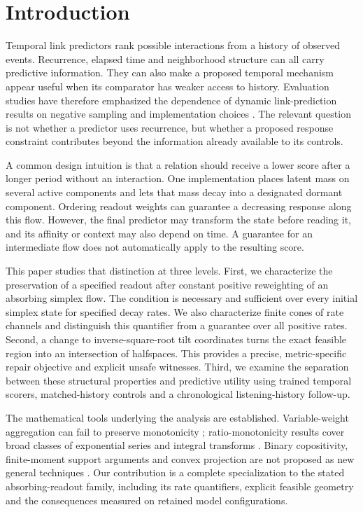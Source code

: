 \section{Introduction}\label{sec:introduction}
Temporal link predictors rank possible interactions from a history of observed events. Recurrence, elapsed time and neighborhood structure can all carry predictive information. They can also make a proposed temporal mechanism appear useful when its comparator has weaker access to history. Evaluation studies have therefore emphasized the dependence of dynamic link-prediction results on negative sampling and implementation choices \cite{evaluation,dyglib}. The relevant question is not whether a predictor uses recurrence, but whether a proposed response constraint contributes beyond the information already available to its controls.

A common design intuition is that a relation should receive a lower score after a longer period without an interaction. One implementation places latent mass on several active components and lets that mass decay into a designated dormant component. Ordering readout weights can guarantee a decreasing response along this flow. However, the final predictor may transform the state before reading it, and its affinity or context may also depend on time. A guarantee for an intermediate flow does not automatically apply to the resulting score.

This paper studies that distinction at three levels. First, we characterize the preservation of a specified readout after constant positive reweighting of an absorbing simplex flow. The condition is necessary and sufficient over every initial simplex state for specified decay rates. We also characterize finite cones of rate channels and distinguish this quantifier from a guarantee over all positive rates. Second, a change to inverse-square-root tilt coordinates turns the exact feasible region into an intersection of halfspaces. This provides a precise, metric-specific repair objective and explicit unsafe witnesses. Third, we examine the separation between these structural properties and predictive utility using trained temporal scorers, matched-history controls and a chronological listening-history follow-up.

The mathematical tools underlying the analysis are established. Variable-weight aggregation can fail to preserve monotonicity \cite{mixture,weighted}; ratio-monotonicity results cover broad classes of exponential series and integral transforms \cite{ratio,series,karp}. Binary copositivity, finite-moment support arguments and convex projection are not proposed as new general techniques \cite{copositive,moment,coordinate}. Our contribution is a complete specialization to the stated absorbing-readout family, including its rate quantifiers, explicit feasible geometry and the consequences measured on retained model configurations.

